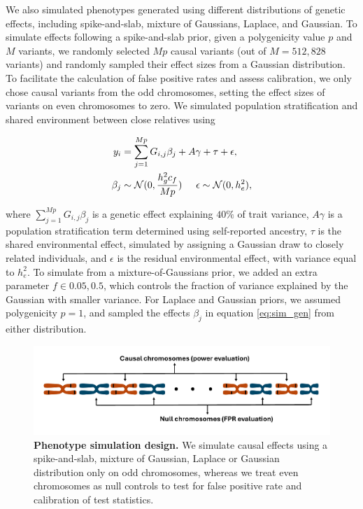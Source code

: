 %
We also simulated phenotypes generated using different distributions of genetic effects, including spike-and-slab, mixture of Gaussians, Laplace, and Gaussian.
%
To simulate effects following a spike-and-slab prior, given a polygenicity value $p$ and $M$ variants, we randomly selected $Mp$ causal variants (out of $M = 512,828$ variants) and randomly sampled their effect sizes from a Gaussian distribution. 
%
To facilitate the calculation of false positive rates and assess calibration, we only chose causal variants from the odd chromosomes, setting the effect sizes of variants on even chromosomes to zero.
%
We simulated population stratification and shared environment between close relatives using
%

\begin{align}
    y_i &= \sum\limits_{j=1}^{Mp} G_{i,j}\beta_j + A\gamma + \tau + \epsilon,  \nonumber \\
    \beta_j &\sim \mathcal{N}(0, \frac{h_g^2 c_f}{Mp}) \hspace{5mm} \epsilon \sim \mathcal{N}(0, h_e^2),
\label{eq:sim_gen}
\end{align}


where $\sum\limits_{j=1}^{Mp} G_{i,j}\beta_j$ is a genetic effect explaining $40\%$ of trait variance, $A\gamma$ is a population stratification term determined using self-reported ancestry, $\tau$ is the shared environmental effect, simulated by assigning a Gaussian draw to closely related individuals, and $\epsilon$ is the residual environmental effect, with variance equal to $h^2_e$.
%
To simulate from a mixture-of-Gaussians prior, we added an extra parameter $f \in {0.05, 0.5}$, which controls the fraction of variance explained by the Gaussian with smaller variance.
%
For Laplace and Gaussian priors, we assumed polygenicity $p = 1$, and sampled the effects $\beta_j$ in equation \ref{eq:sim_gen} from either distribution.
%

\begin{figure}
    \centering
    \includegraphics[width=\linewidth]{figures/thesis_qd_sim_design.pdf}
    \caption{\textbf{Phenotype simulation design.} We simulate causal effects using a spike-and-slab, mixture of Gaussian, Laplace or Gaussian distribution only on odd chromosomes, whereas we treat even chromosomes as null controls to test for false positive rate and calibration of test statistics.}
    \label{fig:qd_sim_design}
\end{figure}

